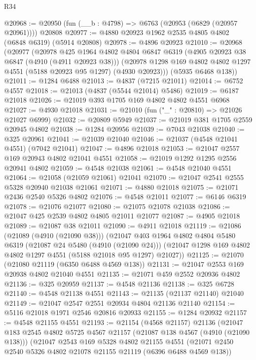 \begin{lexlean}{R34}
\begin{coremodule}
@20968 := @20950 (fun (__b : @4798) => @6763 (@20953 (@6829 (@20957 @20961)))) @20808
@20977 := @4880 @20923 @1962 @2535 @4805 @4802 (@6848 @6319) (@5914 @20808)
@20978 := @4896 @20923
@21010 := @20968
    (@20977
      (@20978
        @425
        @1964
        @4802
        @4804
        @6847
        @6319
        (@4905 @20923 @38 @6847 (@4910 (@4911 @20923 @38)))
        (@20978 @1298 @169 @4802 @4802 @1297 @4551 (@5188 @20923 @95 @1297) (@4930 @20923)))
      (@5935 @6468 @138))
@21011 := @1284 @6488
@21013 := @4837 (@7215 @21011)
@21014 := @6752 @4557
@21018 := @21013 (@4837 (@5544 @21014) @5486)
@21019 := @6187 @21018
@21026 := @21019 @393 @1705 @169 @4802 @4802 @4551 @6968
@21027 := @4930 @21018
@21031 := @21010 (fun ("_" : @20810) => @21026 @21027 @6999)
@21032 := @20809 @5949
@21037 := @21019 @381 @1705 @2559 @20945 @4802
@21038 := @1284 @20956
@21039 := @7043 @21038
@21040 := @325 @20961
@21041 := @21039 @21040
@21046 := @21037 (@4548 @21041 @4551) (@7042 @21041)
@21047 := @4896 @21018
@21053 := @21047 @2557 @169 @20943 @4802 @21041 @4551
@21058 := @21019 @1292 @1295 @2556 @20941 @4802
@21059 := @4548 @21038
@21061 := @4548 @21040 @4551
@21064 := @21058 (@21059 @21061) @21041
@21070 := @21047 @2541 @2555 @5328 @20940 @21038 @21061
@21071 := @4880 @21018
@21075 := @21071 @2436 @2540 @5326 @4802
@21076 := @4548 @21011
@21077 := @6146 @6319
@21078 := @21076 @21077
@21080 := @21075 @21078 @21038
@21086 := @21047 @425 @2539 @4802 @4805 @21011 @21077
@21087 := @4905 @21018
@21089 := @21087 @38 @21011
@21090 := @4911 @21018
@21119 := @21086
    (@21089 (@4910 (@21090 @38)))
    (@21047
      @403
      @1964
      @4802
      @4804
      @5480
      @6319
      (@21087 @24 @5480 (@4910 (@21090 @24)))
      (@21047 @1298 @169 @4802 @4802 @1297 @4551 (@5188 @21018 @95 @1297) @21027))
@21125 := @21070 (@21080 @21119 (@6350 @6488 @4569 @138))
@21131 := @21047 @2553 @169 @20938 @4802 @21040 @4551
@21135 := @21071 @459 @2552 @20936 @4802
@21136 := @325 @20959
@21137 := @4548 @21136
@21138 := @325 @6728
@21140 := @4548 @21138 @4551
@21143 := @21135 (@21137 @21140) @21040
@21149 := @21047 @2547 @2551 @20934 @4804 @21136 @21140
@21154 := @5116 @21018 @1971 @2546 @20816 @20933
@21155 := @1284 @20932
@21157 := @4548 @21155 @4551
@21193 := @21154
    (@4568 @21157)
    @21136
    (@21047
      @183
      @2545
      @4802
      @5725
      @4567
      @21157
      (@21087 @138 @4567 (@4910 (@21090 @138)))
      (@21047
        @2543
        @169
        @5328
        @4802
        @21155
        @4551
        (@21071 @2450 @2540 @5326 @4802 @21078 @21155 @21119 (@6396 @6488 @4569 @138))

\end{coremodule}
\end{lexlean}
